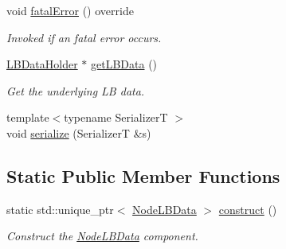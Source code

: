 \begin{DoxyCompactItemize}
void \hyperlink{structvt_1_1vrt_1_1collection_1_1balance_1_1_node_l_b_data_aefbc8058f2d74c3dd6c903e9bfefe0d2}{fatal\+Error} () override
\begin{DoxyCompactList}\small\item\em Invoked if an fatal error occurs. \end{DoxyCompactList}\item 
\hyperlink{structvt_1_1vrt_1_1collection_1_1balance_1_1_l_b_data_holder}{L\+B\+Data\+Holder} $\ast$ \hyperlink{structvt_1_1vrt_1_1collection_1_1balance_1_1_node_l_b_data_aa67707482afa83dfa96910ac42337ef0}{get\+L\+B\+Data} ()
\begin{DoxyCompactList}\small\item\em Get the underlying LB data. \end{DoxyCompactList}\item 
{\footnotesize template$<$typename SerializerT $>$ }\\void \hyperlink{structvt_1_1vrt_1_1collection_1_1balance_1_1_node_l_b_data_aa6b20e4b1920e9294fb8b933dcd8a35b}{serialize} (SerializerT \&s)
\end{DoxyCompactItemize}
\subsection*{Static Public Member Functions}
\begin{DoxyCompactItemize}
\item 
static std\+::unique\+\_\+ptr$<$ \hyperlink{structvt_1_1vrt_1_1collection_1_1balance_1_1_node_l_b_data}{Node\+L\+B\+Data} $>$ \hyperlink{structvt_1_1vrt_1_1collection_1_1balance_1_1_node_l_b_data_a8c75ad477772cebf032e7c3664d2e62c}{construct} ()
\begin{DoxyCompactList}\small\item\em Construct the \hyperlink{structvt_1_1vrt_1_1collection_1_1balance_1_1_node_l_b_data}{Node\+L\+B\+Data} component. \end{DoxyCompactList}\end{DoxyCompactItemize}
